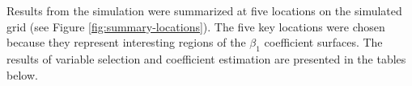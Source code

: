 \documentclass[authoryear, review, 11pt]{elsarticle}
\begin{document}
	
	Results from the simulation were summarized at five locations on the simulated grid (see Figure \ref{fig:summary-locations}). The five key locations were chosen because they represent interesting regions of the $\beta_1$ coefficient surfaces. The results of variable selection and coefficient estimation are presented in the tables below.
	
	

\end{document}
